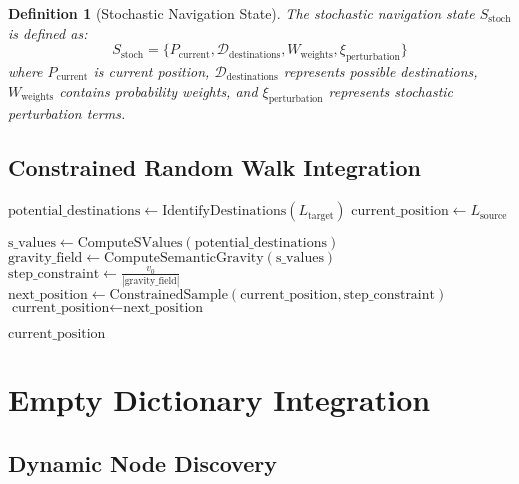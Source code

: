 \documentclass[12pt,a4paper]{article}
\newtheorem{definition}{Definition}
\begin{document}
\begin{definition}[Stochastic Navigation State]
The stochastic navigation state $S_{\text{stoch}}$ is defined as:
\begin{equation}
S_{\text{stoch}} = \{P_{\text{current}}, \mathcal{D}_{\text{destinations}}, W_{\text{weights}}, \xi_{\text{perturbation}}\}
\end{equation}
where $P_{\text{current}}$ is current position, $\mathcal{D}_{\text{destinations}}$ represents possible destinations, $W_{\text{weights}}$ contains probability weights, and $\xi_{\text{perturbation}}$ represents stochastic perturbation terms.
\end{definition}

\subsection{Constrained Random Walk Integration}

\begin{algorithm}[H]
\caption{Constrained Stochastic Navigation}
\label{alg:stochastic_navigation}
\begin{algorithmic}[1]
    \State $\text{potential\_destinations} \gets \text{IdentifyDestinations}(L_{\text{target}})$
    \State $\text{current\_position} \gets L_{\text{source}}$

        \State $\text{s\_values} \gets \text{ComputeSValues}(\text{potential\_destinations})$
        \State $\text{gravity\_field} \gets \text{ComputeSemanticGravity}(\text{s\_values})$
        \State $\text{step\_constraint} \gets \frac{v_0}{|\text{gravity\_field}|}$
        \State $\text{next\_position} \gets \text{ConstrainedSample}(\text{current\_position}, \text{step\_constraint})$
        \State $\text{current\_position} \gets \text{next\_position}$
    \EndWhile

    \State \Return $\text{current\_position}$
\EndProcedure
\end{algorithmic}
\end{algorithm}

\section{Empty Dictionary Integration}

\subsection{Dynamic Node Discovery}
\end{document}
